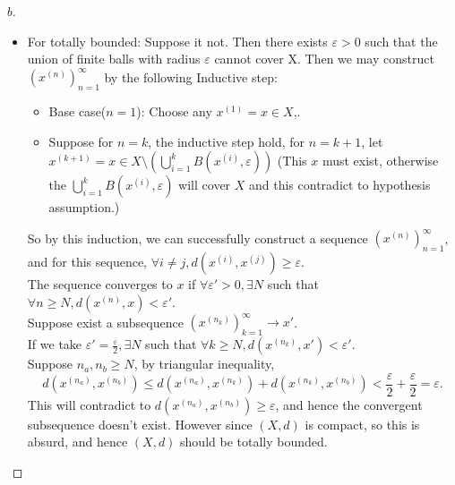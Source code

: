 \begin{proof}[b]
\begin{itemize}
        \item For totally bounded: Suppose it not. Then there exists $\varepsilon > 0$ such that the union of finite balls with radius $\varepsilon$ cannot cover X.
        Then we may construct $(x^{(n)})_{n=1}^{\infty}$ by the following Inductive step:
        \begin{itemize}
            \item Base case($n = 1$): Choose any $x^{(1)} = x \in X$,.
            \item Suppose for $n = k$, the inductive step hold, for $n = k + 1$, let $x^{(k+1)} = x \in X \setminus (\bigcup_{i=1}^{k} B(x^{(i)}, \varepsilon))$ (This $x$ must exist, otherwise the $\bigcup_{i=1}^{k} B(x^{(i)}, \varepsilon)$ will cover $X$ and this contradict to hypothesis assumption.) 
        \end{itemize}
        So by this induction, we can successfully construct a sequence $(x^{(n)})_{n=1}^{\infty}$, and for this sequence, $\forall i \neq j, d(x^{(i)}, x^{(j)}) \geq \varepsilon$. \\
        The sequence converges to $x$ if $\forall \varepsilon' > 0, \exists N$ such that $\forall n \geq N, d(x^{(n)}, x) < \varepsilon'$. \\
        Suppose exist a subsequence $(x^{(n_k)})_{k=1}^{\infty} \to x'$. \\
        If we take $\varepsilon' = \frac{\varepsilon}{2}, \exists N$ such that $\forall k \geq N, d(x^{(n_k)}, x') < \varepsilon'$. \\
        Suppose $n_a, n_b \geq N$, by triangular inequality,
        \[
            d(x^{(n_a)}, x^{(n_b)}) \leq d(x^{(n_a)}, x^{(n_k)}) + d(x^{(n_k)}, x^{(n_b)}) < \frac{\varepsilon}{2} + \frac{\varepsilon}{2} = \varepsilon.
        \]
        This will contradict to $d(x^{(n_a)}, x^{(n_b)}) \geq \varepsilon$, and hence the convergent subsequence doesn't exist. However since $(X,d)$ is compact, so this is absurd, and hence $(X,d)$ should be totally bounded.
    \end{itemize}
\end{proof}
